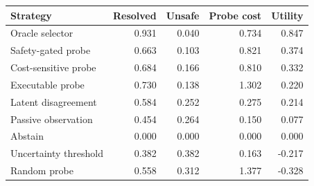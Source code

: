 \begin{tabular}{lrrrr}
\toprule
Strategy & Resolved & Unsafe & Probe cost & Utility \\
\midrule
Oracle selector & 0.931 & 0.040 & 0.734 & 0.847 \\
Safety-gated probe & 0.663 & 0.103 & 0.821 & 0.374 \\
Cost-sensitive probe & 0.684 & 0.166 & 0.810 & 0.332 \\
Executable probe & 0.730 & 0.138 & 1.302 & 0.220 \\
Latent disagreement & 0.584 & 0.252 & 0.275 & 0.214 \\
Passive observation & 0.454 & 0.264 & 0.150 & 0.077 \\
Abstain & 0.000 & 0.000 & 0.000 & 0.000 \\
Uncertainty threshold & 0.382 & 0.382 & 0.163 & -0.217 \\
Random probe & 0.558 & 0.312 & 1.377 & -0.328 \\
\bottomrule
\end{tabular}
